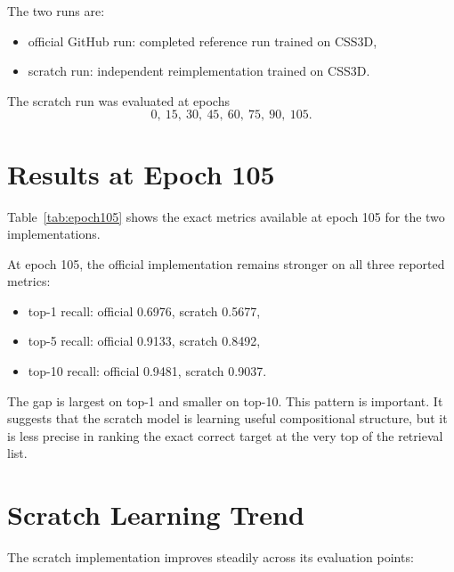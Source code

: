 \documentclass[11pt]{article}
\begin{document}
The two runs are:
\begin{itemize}[leftmargin=*]
  \item official GitHub run: completed reference run trained on CSS3D,
  \item scratch run: independent reimplementation trained on CSS3D.
\end{itemize}

The scratch run was evaluated at epochs
\[
0,\ 15,\ 30,\ 45,\ 60,\ 75,\ 90,\ 105.
\]

\section{Results at Epoch 105}
Table~\ref{tab:epoch105} shows the exact metrics available at epoch 105 for the two implementations.

\begin{table}[h]
\centering

\caption{Official GitHub implementation versus scratch implementation at epoch 105 on CSS3D test retrieval. Gap is Scratch minus Official.}
\label{tab:epoch105}
\end{table}

At epoch 105, the official implementation remains stronger on all three reported metrics:
\begin{itemize}[leftmargin=*]
  \item top-1 recall: official 0.6976, scratch 0.5677,
  \item top-5 recall: official 0.9133, scratch 0.8492,
  \item top-10 recall: official 0.9481, scratch 0.9037.
\end{itemize}

The gap is largest on top-1 and smaller on top-10. This pattern is important. It suggests that the scratch model is learning useful compositional structure, but it is less precise in ranking the exact correct target at the very top of the retrieval list.

\section{Scratch Learning Trend}
The scratch implementation improves steadily across its evaluation points:
\end{document}
